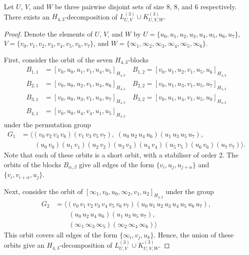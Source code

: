 \begin{subappendices}

\begin{example} \label{eg:H_43-l88-k886}
Let $U$, $V$, and $W$ be three pairwise disjoint sets of size 8, 8, and 6 respectively.
There exists an $H_{4,3}$-decomposition of $L_{U,V}^{(3)} \cup K_{U,V,W}^{(3)}$.
\end{example}

\begin{proof}
Denote the elements of $U$, $V$, and $W$ by $U = \{u_0, u_1, u_2, u_3, u_4, u_5, u_6, u_7\}$,
  $V = \{v_0, v_1, v_2, v_3, v_4, v_5, v_6, v_7\}$, and
  $W = \{\infty_1, \infty_2, \infty_3, \infty_4, \infty_5, \infty_6\}$.

First, consider the orbit of the seven $H_{4,3}$-blocks
\begin{align*}
    B_{1,1} &= [v_0, u_0, u_1, v_1, u_4, u_5]_{H_{4,3}} \quad
    B_{1,2} = [v_0, u_1, u_2, v_1, u_5, u_6]_{H_{4,3}} \\
    B_{2,1} &= [v_0, u_0, u_2, v_1, u_4, u_6]_{H_{4,3}} \quad
    B_{2,2} = [v_0, u_1, u_3, v_1, u_5, u_7]_{H_{4,3}} \\
    B_{3,1} &= [v_0, u_0, u_3, v_1, u_4, u_7]_{H_{4,3}} \quad
    B_{3,2} = [v_0, u_1, u_4, v_1, u_5, u_0]_{H_{4,3}} \\
    B_{4,1} &= [v_0, u_0, u_4, v_4, u_1, u_5]_{H_{4,3}}
\end{align*}
under the permutation group
\begin{align*}
    G_1 &= \langle (v_0 \, v_2 \, v_4 \, v_6) (v_1 \, v_3 \, v_5 \, v_7),
    \; (u_0 \, u_2 \, u_4 \, u_6) (u_1 \, u_3 \, u_5 \, u_7), \\
    & \quad \quad (u_0 \, v_0) (u_1 \, v_1) (u_2 \, v_2) (u_3 \, v_3) (u_4 \, v_4)
    (u_5 \, v_5) (u_6 \, v_6) (u_7 \, v_7) \rangle.
\end{align*}
Note that each of these orbits is a short orbit, with a stabiliser of order 2.
The orbits of the blocks $B_{\alpha,\beta}$ give all edges of the form $\{v_i, u_j, u_{j+\alpha}\}$ and $\{v_i, v_{i+\alpha}, u_j\}$.

Next, consider the orbit of $[\infty_1, v_0, u_0, \infty_2, v_1, u_2]_{H_{4,3}}$ under the group
\begin{align*}
    G_2 &= \langle
    (v_0 \, v_1 \, v_2 \, v_3 \, v_4 \, v_5 \, v_6 \, v_7)
    (u_0 \, u_1 \, u_2 \, u_3 \, u_4 \, u_5 \, u_6 \, u_7), \\
    & \quad \quad
    (u_0 \, u_2 \, u_4 \, u_6) (u_1 \, u_3 \, u_5 \, u_7), \\
    & \quad \quad
    (\infty_1 \, \infty_3 \, \infty_5) (\infty_2 \, \infty_4 \, \infty_6)
    \rangle
\end{align*}
This orbit covers all edges of the form $\{\infty_i, v_j, u_k\}$.
Hence, the union of these orbits give an $H_{4,3}$-decomposition of $L_{U,V}^{(3)} \cup K_{U,V,W}^{(3)}$.
\end{proof}


\end{subappendices}
